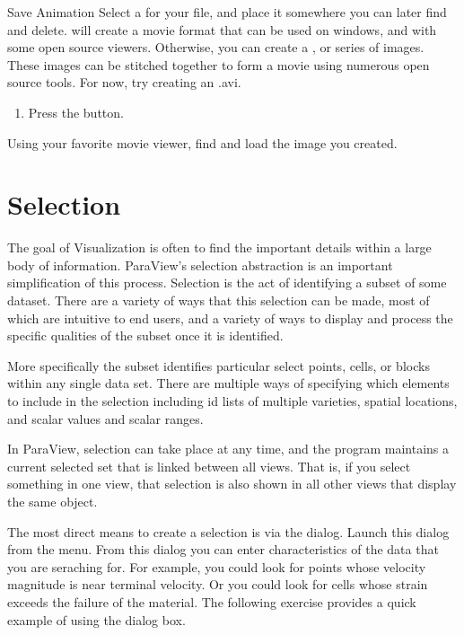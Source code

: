 \begin{exercise}{Save Animation}
  Select a  for your file, and place it somewhere you can
  later find and delete.   will create a movie format that
  can be used on windows, and with some open source viewers.  Otherwise,
  you can create a , or series of images.  These images
  can be stitched together to form a movie using numerous open source
  tools.  For now, try creating an .avi.

  \begin{enumerate}
    \restorecounter
    \item Press the  button.
  \end{enumerate}

  Using your favorite movie viewer, find and load the image you created.
\end{exercise}


\section{Selection}

The goal of Visualization is often to find the important details within a
large body of information. ParaView's selection abstraction is an
important simplification of this process. Selection is the act of
identifying a subset of some dataset. There are a variety of ways that
this selection can be made, most of which are intuitive to end users,
and a variety of ways to display and process the specific qualities of
the subset once it is identified.

More specifically the subset identifies particular select points, cells, or
blocks within any single data set.  There are multiple ways of
specifying which elements to include in the selection including id
lists of multiple varieties, spatial locations, and scalar values and
scalar ranges.

In ParaView, selection can take place at any time, and the program
maintains a current selected set that is linked between all views.
That is, if you select something in one view, that selection is also
shown in all other views that display the same object.

The most direct means to create a selection is via the 
dialog. Launch this dialog from the  menu.  From this dialog you
can enter characteristics of the data that you are seraching for.  For
example, you could look for points whose velocity magnitude is near
terminal velocity.  Or you could look for cells whose strain exceeds the
failure of the material.  The following exercise provides a quick example
of using the  dialog box.

